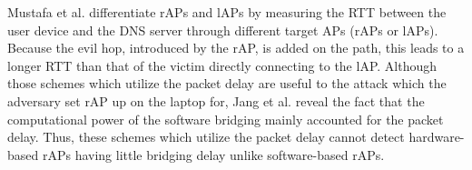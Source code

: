 \documentclass[conference]{IEEEtran}
\begin{document}
Mustafa et al. \cite{rtt} differentiate rAPs and lAPs by measuring the RTT between the user device and the DNS server through different target APs (rAPs or lAPs).
Because the evil hop, introduced by the rAP, is added on the path, this leads to a longer RTT than that of the victim directly connecting to the lAP.
Although those schemes which utilize the packet delay are useful to the attack which the adversary set rAP up on the laptop for, Jang et al. \cite{previous} reveal the fact that the computational power of the software bridging mainly accounted for the packet delay.
Thus, these schemes which utilize the packet delay cannot detect hardware-based rAPs having little bridging delay unlike software-based rAPs.
\end{document}
